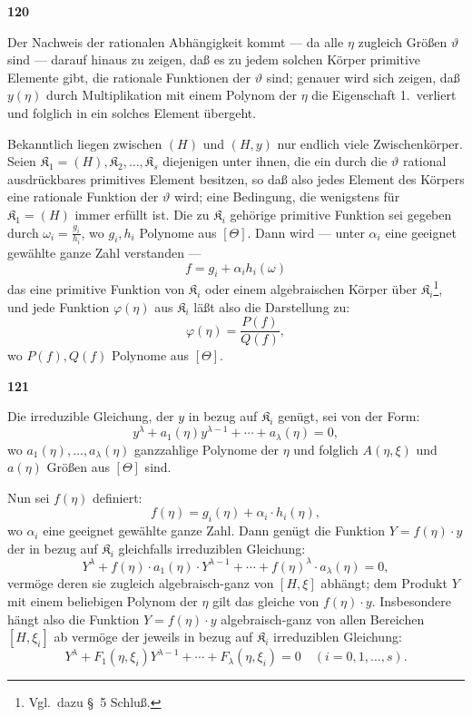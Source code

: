 \documentclass[12pt,a4paper]{article}
\begin{document}
\newpage
\begin{center}
\textbf{120}
\end{center}

Der Nachweis der rationalen Abh\"angigkeit kommt --- da alle $\eta$ zugleich Gr\"o\ss en $\vartheta$ sind --- darauf hinaus zu zeigen, da\ss{} es zu jedem solchen K\"orper primitive Elemente gibt, die rationale Funktionen der $\vartheta$ sind; genauer wird sich zeigen, da\ss{} $y(\eta)$ durch Multiplikation mit einem Polynom der $\eta$ die Eigenschaft 1.\ verliert und folglich in ein solches Element \"ubergeht.

Bekanntlich liegen zwischen $(H)$ und $(H, y)$ nur endlich viele Zwischenk\"orper. Seien $\mathfrak{K}_1 = (H), \mathfrak{K}_2, \ldots, \mathfrak{K}_s$ diejenigen unter ihnen, die ein durch die $\vartheta$ rational ausdr\"uckbares primitives Element besitzen, so da\ss{} also jedes Element des K\"orpers eine rationale Funktion der $\vartheta$ wird; eine Bedingung, die wenigstens f\"ur $\mathfrak{K}_1 = (H)$ immer erf\"ullt ist. Die zu $\mathfrak{K}_i$ geh\"orige primitive Funktion sei gegeben durch $\omega_i = \frac{g_i}{h_i}$, wo $g_i, h_i$ Polynome aus $[\Theta]$. Dann wird --- unter $\alpha_i$ eine geeignet gew\"ahlte ganze Zahl verstanden ---
\[f = g_i + \alpha_i h_i(\omega)\]
das eine primitive Funktion von $\mathfrak{K}_i$ oder einem algebraischen K\"orper \"uber $\mathfrak{K}_i$\footnote{Vgl.\ dazu \S\ 5 Schlu\ss .}, und jede Funktion $\varphi(\eta)$ aus $\mathfrak{K}_i$ l\"a\ss t also die Darstellung zu:
\[\varphi(\eta) = \frac{P(f)}{Q(f)},\]
wo $P(f), Q(f)$ Polynome aus $[\Theta]$.

\newpage
\begin{center}
\textbf{121}
\end{center}

Die irreduzible Gleichung, der $y$ in bezug auf $\mathfrak{K}_i$ gen\"ugt, sei von der Form:
\[y^{\lambda} + a_1(\eta) y^{\lambda-1} + \cdots + a_{\lambda}(\eta) = 0,\]
wo $a_1(\eta), \ldots, a_{\lambda}(\eta)$ ganzzahlige Polynome der $\eta$ und folglich $A(\eta, \xi)$ und $a(\eta)$ Gr\"o\ss en aus $[\Theta]$ sind.

Nun sei $f(\eta)$ definiert:
\[f(\eta) = g_i(\eta) + \alpha_i \cdot h_i(\eta),\]
wo $\alpha_i$ eine geeignet gew\"ahlte ganze Zahl. Dann gen\"ugt die Funktion $Y = f(\eta) \cdot y$ der in bezug auf $\mathfrak{K}_i$ gleichfalls irreduziblen Gleichung:
\[Y^{\lambda} + f(\eta) \cdot a_1(\eta) \cdot Y^{\lambda-1} + \cdots + f(\eta)^{\lambda} \cdot a_{\lambda}(\eta) = 0,\]
verm\"oge deren sie zugleich algebraisch-ganz von $[H, \xi]$ abh\"angt; dem Produkt $Y$ mit einem beliebigen Polynom der $\eta$ gilt das gleiche von $f(\eta) \cdot y$. Insbesondere h\"angt also die Funktion $Y = f(\eta) \cdot y$ algebraisch-ganz von allen Bereichen $[H, \xi_i]$ ab verm\"oge der jeweils in bezug auf $\mathfrak{K}_i$ irreduziblen Gleichung:
\begin{equation}\tag{4}
Y^{\lambda} + F_1(\eta, \xi_i) Y^{\lambda-1} + \cdots + F_{\lambda}(\eta, \xi_i) = 0 \quad (i = 0, 1, \ldots, s).
\end{equation}
\end{document}
